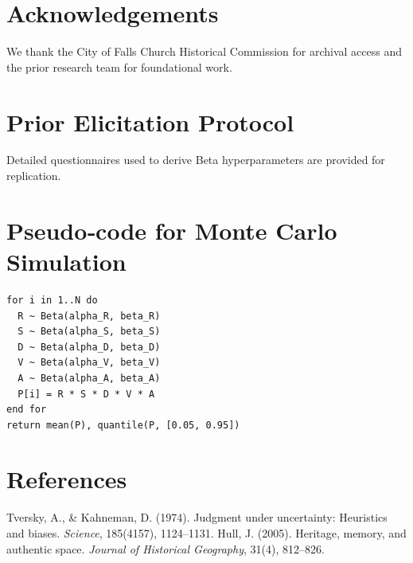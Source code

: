\documentclass[11pt]{article}
\begin{document}
\section*{Acknowledgements}
We thank the City of Falls Church Historical Commission for archival access and the prior research team for foundational work.

\appendix
\section{Prior Elicitation Protocol}
Detailed questionnaires used to derive Beta hyperparameters are provided for replication.

\section{Pseudo‐code for Monte Carlo Simulation}
\label{lst:pseudocode}
\begin{verbatim}
for i in 1..N do
  R ~ Beta(alpha_R, beta_R)
  S ~ Beta(alpha_S, beta_S)
  D ~ Beta(alpha_D, beta_D)
  V ~ Beta(alpha_V, beta_V)
  A ~ Beta(alpha_A, beta_A)
  P[i] = R * S * D * V * A
end for
return mean(P), quantile(P, [0.05, 0.95])
\end{verbatim}

\section*{References}
\begin{thebibliography}{9}
 Tversky, A., \& Kahneman, D. (1974). Judgment under uncertainty: Heuristics and biases. \emph{Science}, 185(4157), 1124–1131.
 Hull, J. (2005). Heritage, memory, and authentic space. \emph{Journal of Historical Geography}, 31(4), 812–826.
\end{thebibliography}
\end{document}
